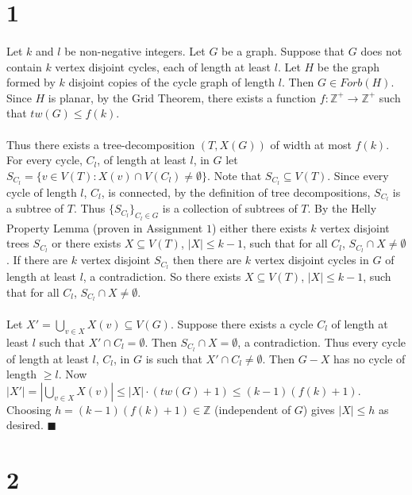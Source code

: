 \documentclass[letterpaper,12pt,oneside,onecolumn]{report}
\begin{document}
\section*{1}
\paragraph{}
Let $k$ and $l$ be non-negative integers. Let $G$ be a graph. Suppose that $G$ does not contain $k$ vertex disjoint cycles, each of length at least $l$. Let $H$ be the graph formed by $k$ disjoint copies of the cycle graph of length $l$. Then $G \in Forb(H)$. Since $H$ is planar, by the Grid Theorem, there exists a function $f: \mathbb{Z}^+ \rightarrow \mathbb{Z}^+$ such that $tw(G) \leq f(k)$.
\paragraph{}
Thus there exists a tree-decomposition $(T, X(G))$ of width at most $f(k)$. For every cycle, $C_l$, of length at least $l$,  in $G$ let $S_{C_l} = \{ v \in V(T) : X(v) \cap V(C_l) \neq \emptyset \}$. Note that $S_{C_l} \subseteq V(T)$. Since every cycle of length $l$, $C_l$, is connected, by the definition of tree decompositions, $S_{C_l}$ is a subtree of $T$. Thus $\{S_{C_l}\}_{C_l \in G}$ is a collection of subtrees of $T$. By the Helly Property Lemma (proven in Assignment $1$) either there exists $k$ vertex disjoint trees $S_{C_l}$ or there exists $X \subseteq V(T)$, $|X| \leq k-1$, such that for all $C_l$, $S_{C_l} \cap X \neq \emptyset$. If there are $k$ vertex disjoint $S_{C_l}$ then there are $k$ vertex disjoint cycles in $G$ of length at least $l$, a contradiction. So there exists $X \subseteq V(T)$, $|X| \leq k-1$, such that for all $C_l$, $S_{C_l}\cap X \neq \emptyset$.
\paragraph{}
Let $X' = \bigcup_{v\in X} X(v) \subseteq V(G)$. Suppose there exists a cycle $C_l$ of length at least $l$ such that $X' \cap C_l = \emptyset$. Then $S_{C_l} \cap X = \emptyset$, a contradiction. Thus every cycle of length at least $l$, $C_l$, in $G$ is such that $X' \cap C_l \neq \emptyset.$ Then $G-X$ has no cycle of length $\geq l$. Now $|X'| = |\bigcup_{v\in X} X(v)| \leq |X|\cdot (tw(G) + 1) \leq (k-1)(f(k) + 1)$.  Choosing $h = (k-1)(f(k) + 1) \in \mathbb{Z}$ (independent of $G$) gives $|X| \leq h$ as desired. $\blacksquare$ 
\section*{2}
\end{document}
